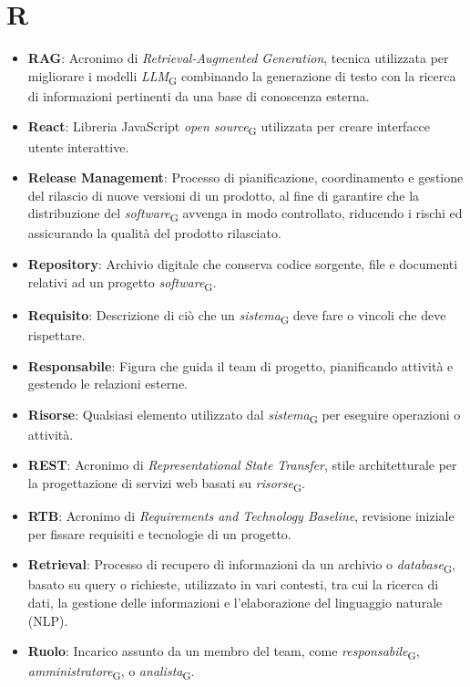 \section{R} 
\begin{itemize}
\item \textbf{RAG}: Acronimo di \textit{Retrieval-Augmented Generation}, tecnica utilizzata per migliorare i modelli 
\textit{LLM}\textsubscript{G} combinando la generazione di testo con la ricerca di informazioni pertinenti da una base di conoscenza esterna. 
\item \textbf{React}: Libreria JavaScript \textit{open source}\textsubscript{G} utilizzata per creare interfacce utente interattive. 
\item \textbf{Release Management}: Processo di pianificazione, coordinamento e gestione del rilascio di nuove versioni di un prodotto, al fine di garantire che la distribuzione del \textit{software}\textsubscript{G} avvenga in modo controllato, riducendo i rischi ed assicurando la qualità del prodotto rilasciato.
\item \textbf{Repository}: Archivio digitale che conserva codice sorgente, file e documenti relativi ad un progetto \textit{software}\textsubscript{G}.
\item \textbf{Requisito}: Descrizione di ciò che un \textit{sistema}\textsubscript{G} deve fare o vincoli che deve rispettare.
\item \textbf{Responsabile}: Figura che guida il team di progetto, pianificando attività e gestendo le relazioni esterne.
\item \textbf{Risorse}: Qualsiasi elemento utilizzato dal \textit{sistema}\textsubscript{G} per eseguire operazioni o attività.
\item \textbf{REST}: Acronimo di \textit{Representational State Transfer}, stile architetturale per la progettazione di servizi web basati su \textit{risorse}\textsubscript{G}.
\item \textbf{RTB}: Acronimo di \textit{Requirements and Technology Baseline}, revisione iniziale per fissare requisiti e tecnologie di un progetto.
\item \textbf{Retrieval}: Processo di recupero di informazioni da un archivio o \textit{database}\textsubscript{G}, basato su query o richieste, utilizzato in vari contesti, tra cui la ricerca di dati, la gestione delle informazioni e l'elaborazione del linguaggio naturale (NLP).
\item \textbf{Ruolo}: Incarico assunto da un membro del team, come \textit{responsabile}\textsubscript{G}, \textit{amministratore}\textsubscript{G}, o \textit{analista}\textsubscript{G}.
\end{itemize}